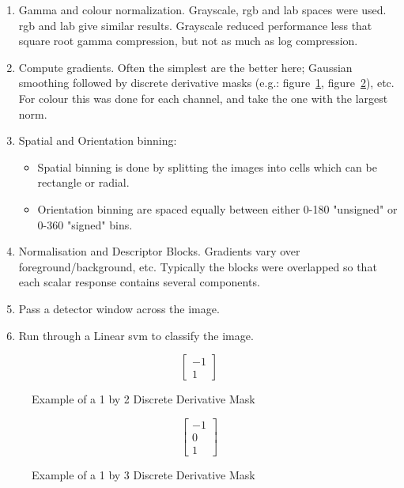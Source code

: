 \begin{enumerate}
\item Gamma and colour normalization. Grayscale, \gls{rgb} and \gls{lab} spaces were used.
\gls{rgb} and \gls{lab} give similar results. Grayscale reduced performance less that square root 
gamma compression, but not as much as log compression.

\item Compute gradients. Often the simplest are the better here; Gaussian smoothing followed by 
discrete derivative masks (e.g.: figure~\ref{fig:1x2-ddm}, figure~\ref{fig:1x3-ddm}), etc. For 
colour this was done for each channel, and take the one with the largest norm.

\item Spatial and Orientation binning:
\begin{itemize}
\item Spatial binning is done by splitting the images into cells which can be rectangle or radial.
\item Orientation binning are spaced equally between either 0-180 "unsigned" or 0-360 "signed" 
bins.
\end{itemize}

\item Normalisation and Descriptor Blocks. Gradients vary over foreground/background, etc. 
Typically the blocks were overlapped so that each scalar response contains several components.

\item Pass a detector window across the image.

\item Run through a Linear \gls{svm} to classify the image.
\end{enumerate}

\begin{figure}[h]
$$
\begin{bmatrix}
-1 \\
1
\end{bmatrix}
$$
\caption{Example of a 1 by 2 Discrete Derivative Mask} \label{fig:1x2-ddm}
\end{figure}

\begin{figure}[h]
$$
\begin{bmatrix}
-1 \\
0 \\
1
\end{bmatrix}
$$
\caption{Example of a 1 by 3 Discrete Derivative Mask} \label{fig:1x3-ddm}
\end{figure}

